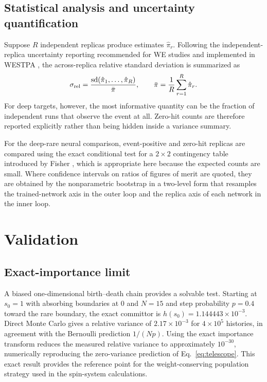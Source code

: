 \documentclass[a4paper,fleqn]{cas-sc}
\begin{document}
\subsection{Statistical analysis and uncertainty quantification}\label{sec:stats}
Suppose $R$ independent replicas produce estimates $\hat\pi_r$. Following the independent-replica
uncertainty reporting recommended for WE studies \citep{zuckerman2017} and implemented in
WESTPA \citep{russo2022}, the across-replica relative standard deviation is summarized as
\begin{equation}
\sigma_{\rm rel}=\frac{\mathrm{sd}(\hat\pi_1,\dots,\hat\pi_R)}{\bar\pi},\qquad
\bar\pi=\frac1R\sum_{r=1}^{R}\hat\pi_r .
\label{eq:relsd}
\end{equation}
For deep targets, however, the most informative quantity can be the fraction of independent
runs that observe the event at all. Zero-hit counts are therefore reported explicitly rather
than being hidden inside a variance summary.

For the deep-rare neural comparison, event-positive and zero-hit replicas are compared using
the exact conditional test for a $2\times2$ contingency table introduced by Fisher
\citep{fisher1922}, which is appropriate here because the expected counts are small. Where
confidence intervals on ratios of figures of merit are quoted, they are obtained by the
nonparametric bootstrap \citep{efron1979} in a two-level form that resamples the
trained-network axis in the outer loop and the replica axis of each network in the inner loop.

\FloatBarrier

\section{Validation}\label{sec:validation}

\subsection{Exact-importance limit}\label{sec:bd}
A biased one-dimensional birth--death chain provides a solvable test. Starting at $s_0=1$
with absorbing boundaries at $0$ and $N=15$ and step probability $p=0.4$ toward the rare
boundary, the exact committor is $h(s_0)=1.144443\times10^{-3}$. Direct Monte Carlo gives a
relative variance of $2.17\times10^{-3}$ for $4\times10^{5}$ histories, in agreement with the
Bernoulli prediction $1/(N p)$. Using the exact importance transform reduces the measured
relative variance to approximately $10^{-30}$, numerically reproducing the zero-variance
prediction of Eq.~\eqref{eq:telescope}. This exact result provides the reference point for
the weight-conserving population strategy used in the spin-system calculations.
\end{document}

